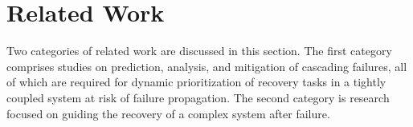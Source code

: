 \documentclass[runningheads]{llncs}
\begin{document}

\section{Related Work}

Two categories of related work are discussed in this section. The first category comprises studies on prediction, analysis, and mitigation of cascading failures, all of which are required for dynamic prioritization of recovery tasks in a tightly coupled system at risk of failure propagation. The second category is research focused on guiding the recovery of a complex system after failure. 


\end{document}
